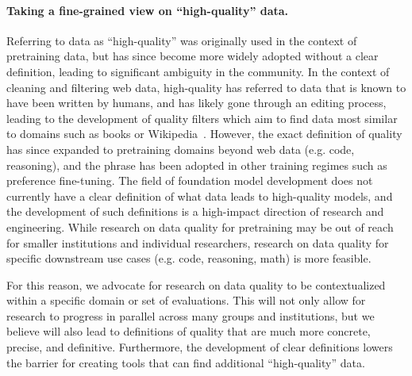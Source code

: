 \paragraph{Taking a fine-grained view on ``high-quality'' data.}
Referring to data as ``high-quality'' was originally used in the context of pretraining data, but has since become more widely adopted without a clear definition, leading to significant ambiguity in the community. In the context of cleaning and filtering web data, high-quality has referred to data that is known to have been written by humans, and has likely gone through an editing process, leading to the development of quality filters which aim to find data most similar to domains such as books or Wikipedia~\citep{browngpt3, chowdhery2023palm}. However, the exact definition of quality has since expanded to pretraining domains beyond web data (e.g. code, reasoning), and the phrase has been adopted in other training regimes such as preference fine-tuning. The field of foundation model development does not currently have a clear definition of what data leads to high-quality models, and the development of such definitions is a high-impact direction of research and engineering. While research on data quality for pretraining may be out of reach for smaller institutions and individual researchers, research on data quality for specific downstream use cases (e.g. code, reasoning, math) is more feasible.

For this reason, we advocate for research on data quality to be contextualized within a specific domain or set of evaluations. This will not only allow for research to progress in parallel across many groups and institutions, but we believe will also lead to definitions of quality that are much more concrete, precise, and definitive.
Furthermore, the development of clear definitions lowers the barrier for creating tools that can find additional ``high-quality'' data.

